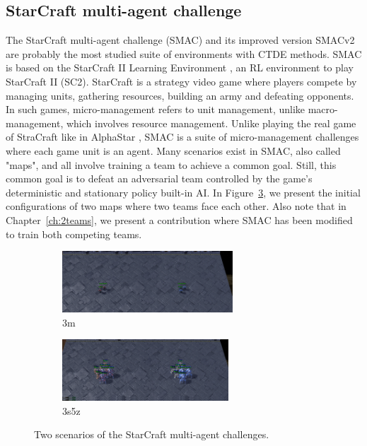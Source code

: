 \subsection{StarCraft multi-agent challenge}
The StarCraft multi-agent challenge (SMAC) \citep{samvelyan2019starcraft} and its improved version SMACv2 \citep{ellis2023smacv2} are probably the most studied suite of environments with CTDE methods.
SMAC is based on the StarCraft II Learning Environment \citep{vinyals2017starcraft}, an RL environment to play StarCraft II (SC2).
StarCraft is a strategy video game where players compete by managing units, gathering resources, building an army and defeating opponents.
In such games, micro-management refers to unit management, unlike macro-management, which involves resource management.
Unlike playing the real game of StraCraft like in AlphaStar \citep{vinyals2019grandmaster}, SMAC is a suite of micro-management challenges where each game unit is an agent.
Many scenarios exist in SMAC, also called "maps", and all involve training a team to achieve a common goal.
Still, this common goal is to defeat an adversarial team controlled by the game's deterministic and stationary policy built-in AI.
In Figure~\ref{fig:ch3_smac}, we present the initial configurations of two maps where two teams face each other.
Also note that in Chapter~\ref{ch:2teams}, we present a contribution where SMAC has been modified to train both competing teams.

\begin{figure}
     \centering
     \begin{subfigure}[b]{0.5\textwidth}
         \centering
         \includegraphics[height=2.3cm]{tex_thesis/figures/ch3/3m_screen.pdf}
         \caption{3m}
         \label{fig:ch3_3m}
     \end{subfigure}%
     \begin{subfigure}[b]{0.5\textwidth}
         \centering
         \includegraphics[height=2.3cm]{tex_thesis/figures/ch3/3s5z_screen.pdf}
         \caption{3s5z}
         \label{fig:ch3_3s5z}
     \end{subfigure}
    \caption{Two scenarios of the StarCraft multi-agent challenges.}
    \label{fig:ch3_smac}
\end{figure}

